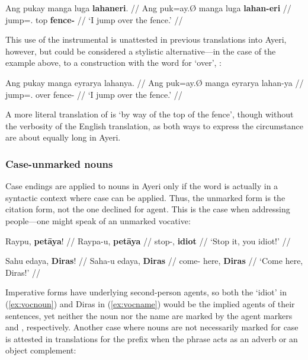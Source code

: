 \ex\begingl
	\gla Ang pukay manga luga \textbf{lahaneri}. //
	\glb Ang puk=ay.Ø manga luga \textbf{lahan-eri} //
	\glc \AgtT{} jump=\Fsg{}.\Top{} \Dyn{} top \textbf{fence-\Ins{}} //
	\glft `I jump over the fence.' //
\endgl\xe

This use of the instrumental is unattested in previous translations into Ayeri, 
however, but could be considered a stylistic alternative---in the case of the 
example above, to a construction with the word for `over', 
:

\ex\begingl
	\gla Ang pukay manga eyrarya lahanya. //
	\glb Ang puk=ay.Ø manga eyrarya lahan-ya //
	\glc \AgtT{} jump=\Fsg{}.\Top{} \Dyn{} over fence-\Loc{} //
	\glft `I jump over the fence.' //
\endgl\xe

A more literal translation of  is `by 
way of the top of the fence', though without the verbosity of the English 
translation, as both ways to express the circumstance are about equally long in 
Ayeri.


\subsubsection{Case-unmarked nouns}
\label{subsec:uncased}

Case endings are applied to nouns in Ayeri only if the word is actually in a 
syntactic context where case can be applied. Thus, the unmarked form is the 
citation form, not the one declined for agent. This is the case when addressing 
people---one might speak of an unmarked vocative:

\pex
\a\label{ex:vocnoun}\begingl
	\gla Raypu, \textbf{petāya}! //
	\glb Raypa-u, \textbf{petāya} //
	\glc stop-\Imp{}, \textbf{idiot} //
	\glft `Stop it, you idiot!' //
\endgl

\a\label{ex:vocname}\begingl
	\gla Sahu edaya, \textbf{Diras}! //
	\glb Saha-u edaya, \textbf{Diras} //
	\glc come-\Imp{} here, \textbf{Diras} //
	\glft `Come here, Diras!' //
\endgl
\xe

Imperative forms have underlying second-person agents, so both the `idiot' in 
(\ref{ex:vocnoun}) and Diras in (\ref{ex:vocname}) would be the implied agents 
of their sentences, yet neither the noun nor the name are marked by the agent 
markers  and , respectively. Another case where 
nouns are not necessarily marked for case is attested in translations for the 
prefix  when the phrase acts as an adverb or an 
object complement:

